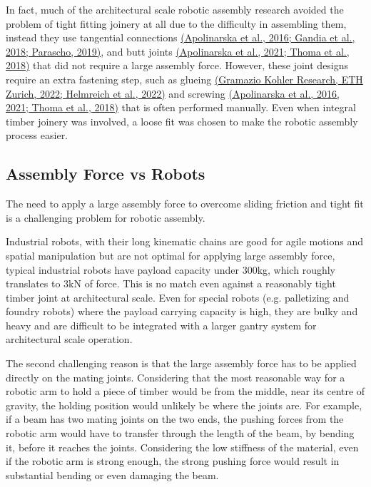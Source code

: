 In fact, much of the architectural scale robotic assembly research avoided the problem of tight fitting joinery at all due to the difficulty in assembling them, instead they use tangential connections \href{https://www.zotero.org/google-docs/?I1l6rV}{(Apolinarska et al., 2016; Gandia et al., 2018; Parascho, 2019)}, and butt joints \href{https://www.zotero.org/google-docs/?1HKFGK}{(Apolinarska et al., 2021; Thoma et al., 2018)} that did not require a large assembly force. However, these joint designs require an extra fastening step, such as glueing \href{https://www.zotero.org/google-docs/?uhxjvO}{(Gramazio Kohler Research, ETH Zurich, 2022; Helmreich et al., 2022)} and screwing \href{https://www.zotero.org/google-docs/?uAzdbA}{(Apolinarska et al., 2016, 2021; Thoma et al., 2018)} that is often performed manually. Even when integral timber joinery was involved, a loose fit was chosen to make the robotic assembly process easier. 

\subsection{Assembly Force vs Robots}

The need to apply a large assembly force to overcome sliding friction and tight fit is a challenging problem for robotic assembly. 

Industrial robots, with their long kinematic chains are good for agile motions and spatial manipulation but are not optimal for applying large assembly force, typical industrial robots have payload capacity under 300kg, which roughly translates to 3kN of force. This is no match even against a reasonably tight timber joint at architectural scale. Even for special robots (e.g. palletizing and foundry robots) where the payload carrying capacity is high, they are bulky and heavy and are difficult to be integrated with a larger gantry system for architectural scale operation. 

The second challenging reason is that the large assembly force has to be applied directly on the mating joints. Considering that the most reasonable way for a robotic arm to hold a piece of timber would be from the middle, near its centre of gravity, the holding position would unlikely be where the joints are. For example, if a beam has two mating joints on the two ends, the pushing forces from the robotic arm would have to transfer through the length of the beam, by bending it, before it reaches the joints. Considering the low stiffness of the material, even if the robotic arm is strong enough, the strong pushing force would result in substantial bending or even damaging the beam. 


